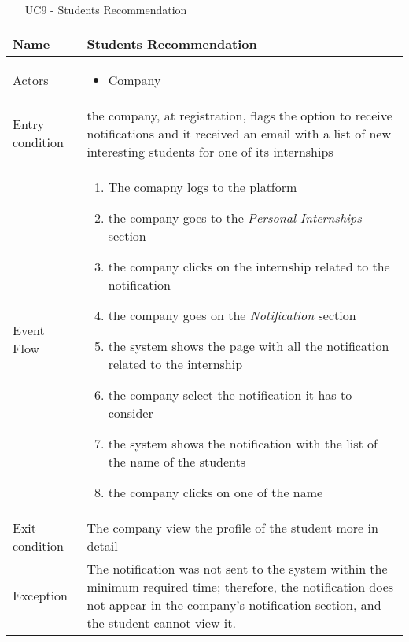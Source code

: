 				\begin{table} [H]
					\centering
					\begin{itemize}
						\item [UC9] - Students Recommendation
					\end{itemize}
					\begin{tabular}{|| P{7.5cm} | P{7.5cm} ||}
						\hline
						Name & Students Recommendation \\
						\hline
						Actors & \parbox{5cm}{\begin{itemize}
								\item Company
							\end{itemize}
						} \\
						\hline
						Entry condition & the company, at registration, flags the 
						option to receive notifications and it received an email with a list of new interesting students for one of its internships\\
						\hline
						Event Flow & \parbox{5cm}{\begin{enumerate}[label=\alpha]
								\item The comapny logs to the platform  
								\item the company goes to the \textit{Personal Internships} 
								section
								\item  the company clicks on the internship related to the notification
								\item the company goes on the \textit{Notification} section 
								\item the system shows the page with all the notification related to the internship
								\item the company select the notification it has to consider
								\item the system shows the notification with the list of the name of the students
								\item the company clicks on one of the name
						\end{enumerate}} \\
						\hline 
						Exit condition & The company view the profile of the student more in 
						detail \\
						\hline
						Exception & The notification was not sent to the system within the minimum required time; therefore, the notification does not appear in the company's notification section, and the student cannot view it. \\
						\hline
					\end{tabular}
				\end{table}
				
